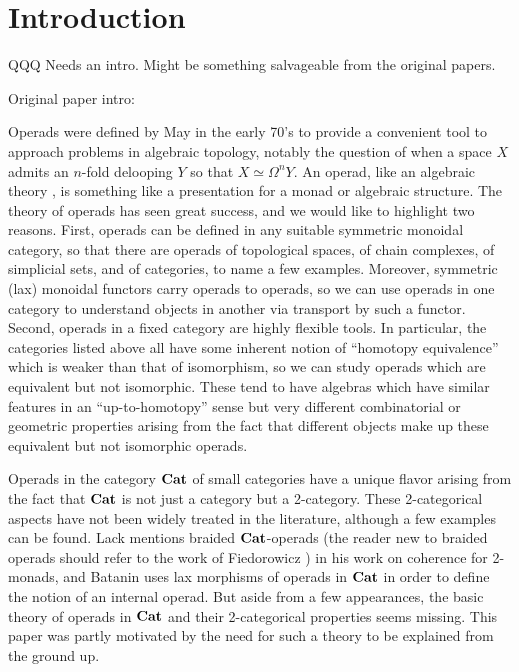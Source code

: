 \section{Introduction}
QQQ Needs an intro. Might be something salvageable from the original papers.

Original paper intro:

Operads were defined by May \cite{maygeom} in the early 70's to provide a convenient tool to approach problems in algebraic topology, notably the question of when a space $X$ admits an $n$-fold delooping $Y$ so that $X \simeq \Omega^{n}Y$.  An operad, like an algebraic theory \cite{lawvere-thesis}, is something like a presentation for a monad or algebraic structure.  The theory of operads has seen great success, and we would like to highlight two reasons.  First, operads can be defined in any suitable symmetric monoidal category, so that there are operads of topological spaces, of chain complexes, of simplicial sets, and of categories, to name a few examples.  Moreover, symmetric (lax) monoidal functors carry operads to operads, so we can use operads in one category to understand objects in another via transport by such a functor.  Second, operads in a fixed category are highly flexible tools.  In particular, the categories listed above all have some inherent notion of ``homotopy equivalence'' which is weaker than that of isomorphism, so we can study operads which are equivalent but not isomorphic.  These tend to have algebras which have similar features in an ``up-to-homotopy'' sense but very different combinatorial or geometric properties arising from the fact that different objects make up these equivalent but not isomorphic operads.

Operads in the category $\mathbf{Cat}$ of small categories have a unique flavor arising from the fact that $\mathbf{Cat}$ is not just a category but a 2-category.  These 2-categorical aspects have not been widely treated in the literature, although a few examples can be found.  Lack \cite{lack-cod} mentions braided $\mathbf{Cat}$-operads (the reader new to braided operads should refer to the work of Fiedorowicz \cite{fie-br}) in his work on coherence for 2-monads, and Batanin \cite{bat-eh} uses lax morphisms of operads in $\mathbf{Cat}$ in order to define the notion of an internal operad.  But aside from a few appearances, the basic theory of operads in $\mathbf{Cat}$ and their 2-categorical properties seems missing.  This paper was partly motivated by the need for such a theory to be explained from the ground up.

